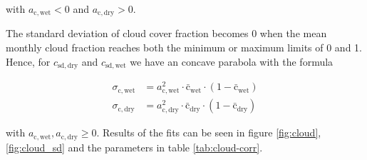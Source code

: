 \begin{refsection}
with $a_{\mathrm{c}, \mathrm{wet}} < 0$ and $a_{\mathrm{c}, \mathrm{dry}} > 0$.

The standard deviation of cloud cover fraction becomes 0 when the mean monthly cloud fraction reaches both the minimum or maximum limits of 0 and 1. Hence, for $c_\mathrm{sd,dry}$ and $c_\mathrm{sd,wet}$ we have an concave parabola with the formula

\begin{align}
\sigma_{\mathrm{c}, \mathrm{wet}} &= a_{\mathrm{c}, \mathrm{wet}}^2 \cdot \bar{\mathrm{c}}_\mathrm{wet} \cdot (1 - \bar{\mathrm{c}}_\mathrm{wet}) \nonumber \\
\sigma_{\mathrm{c}, \mathrm{dry}} &= a_{\mathrm{c}, \mathrm{dry}}^2 \cdot \bar{\mathrm{c}}_\mathrm{dry} \cdot (1 - \bar{\mathrm{c}}_\mathrm{dry}) \label{eq:cloud_sd}
\end{align}

with $a_{\mathrm{c}, \mathrm{wet}}, a_{\mathrm{c}, \mathrm{dry}} \geq 0$. Results of the fits can be seen in figure \ref{fig:cloud}, \ref{fig:cloud_sd} and the parameters in table \ref{tab:cloud-corr}.



\end{refsection}
